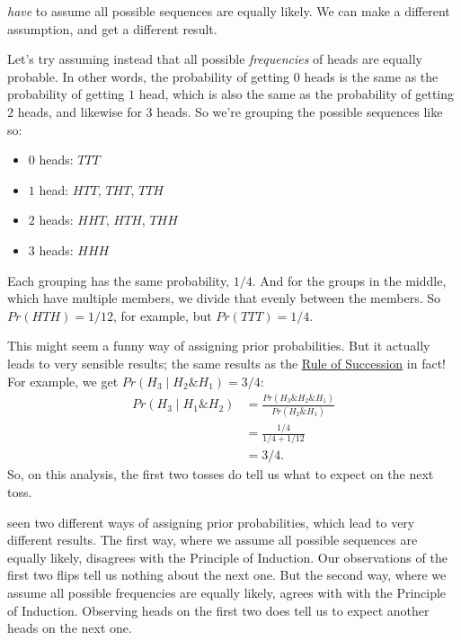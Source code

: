 \documentclass[justified]{tufte-book}
\providecommand{\tightlist}{%
  \setlength{\itemsep}{0pt}\setlength{\parskip}{0pt}}
\newcommand{\given}{\mid}
\renewcommand{\wedge}{\mathbin{\&}}
\newcommand{\p}{Pr}
\theoremstyle{definition}
\theoremstyle{definition}
\theoremstyle{definition}
\theoremstyle{definition}
\theoremstyle{remark}
\begin{document}
 \emph{have} to assume all possible sequences are equally likely. We can make a different assumption, and get a different result.

Let's try assuming instead that all possible \emph{frequencies} of heads are equally probable. In other words, the probability of getting \(0\) heads is the same as the probability of getting \(1\) head, which is also the same as the probability of getting \(2\) heads, and likewise for \(3\) heads. So we're grouping the possible sequences like so:

\begin{itemize}
\tightlist
\item
  \(0\) heads: \(TTT\)
\item
  \(1\) head: \(HTT\), \(THT\), \(TTH\)
\item
  \(2\) heads: \(HHT\), \(HTH\), \(THH\)
\item
  \(3\) heads: \(HHH\)
\end{itemize}

Each grouping has the same probability, \(1/4\). And for the groups in the middle, which have multiple members, we divide that evenly between the members. So \(\p(HTH) = 1/12\), for example, but \(\p(TTT) = 1/4\).

This might seem a funny way of assigning prior probabilities. But it actually leads to very sensible results; the same results as the \protect\hyperlink{succession}{Rule of Succession} in fact! For example, we get \(\p(H_3 \given H_2 \wedge H_1) = 3/4\):
\[
  \begin{aligned}
    \p(H_3 \given H_1 \wedge H_2)
      &= \frac{\p(H_3 \wedge H_2 \wedge H_1)}{\p(H_2 \wedge H_1)}\\
      &= \frac{1/4}{1/4 + 1/12}\\
      &= 3/4.
  \end{aligned}
\]
So, on this analysis, the first two tosses do tell us what to expect on the next toss.

 seen two different ways of assigning prior probabilities, which lead to very different results. The first way, where we assume all possible sequences are equally likely, disagrees with the Principle of Induction. Our observations of the first two flips tell us nothing about the next one. But the second way, where we assume all possible frequencies are equally likely, agrees with with the Principle of Induction. Observing heads on the first two does tell us to expect another heads on the next one.
\end{document}
